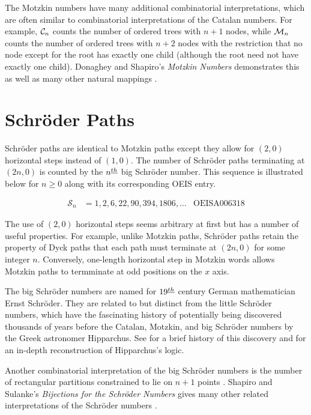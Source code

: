The Motzkin numbers have many additional combinatorial interpretations, which are often similar to combinatorial interpretations of the Catalan numbers.  For example, $\mathcal{C}_n$ counts the number of ordered trees with $n+1$ nodes, while $\mathcal{M}_n$ counts the number of ordered trees with $n+2$ nodes with the restriction that no node except for the root has exactly one child (although the root need not have exactly one child). Donaghey and Shapiro's \emph{Motzkin Numbers} demonstrates this as well as many other natural mappings \cite{donaghey1977motzkin}.

\section{Schröder Paths}\label{sec:schroder}

Schröder paths are identical to Motzkin paths except they allow for $(2,0)$ horizontal steps instead of $(1,0)$.  The number of Schröder paths terminating at $(2n,0)$ is counted by the $n^{\underline{th}}$ big Schröder number.  This sequence is illustrated below for $n \ge 0$ along with its corresponding OEIS entry.

\begin{align}
\mathcal{S}_n &= 1, 2, 6, 22, 90, 394, 1806, \ldots & \text{OEIS} \text{A}006318
\end{align}

The use of $(2,0)$ horizontal steps seems arbitrary at first but has a number of useful properties.  For example, unlike Motzkin paths, Schröder paths retain the property of Dyck paths that each path must terminate at $(2n,0)$ for some integer $n$.  Conversely, one-length horizontal step in Motzkin words allows Motzkin paths to termminate at odd positions on the $x$ axis.  

The big Schröder numbers are named for $19^{\underline{th}}$ century German mathematician Ernst Schröder.  They are related to but distinct from the little Schröder numbers, which have the fascinating history of potentially being discovered thousands of years before the Catalan, Motzkin, and big Schröder numbers by the Greek astronomer Hipparchus.  See \cite{stanley1997hipparchus} for a brief history of this discovery and \cite{bobzien2011combinatorics} for an in-depth reconstruction of Hipparchus's logic. 

Another combinatorial interpretation of the big Schröder numbers is the number of rectangular partitions constrained to lie on $n+1$ points \cite{ackerman2004number}.  Shapiro and Sulanke's \emph{Bijections for the Schröder Numbers} gives many other related interpretations of the Schröder numbers \cite{shapiro2000bijections}.

